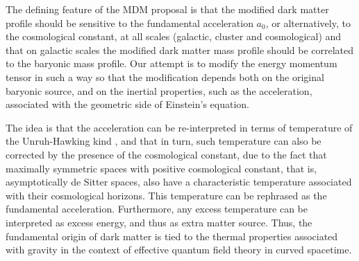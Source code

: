 \documentclass{bjp}
\begin{document}
The defining feature of the MDM proposal is that the modified dark matter profile should be sensitive to the fundamental acceleration $a_0$, or alternatively, to the cosmological constant, at all scales (galactic, cluster and cosmological) and that on galactic scales the modified dark matter mass profile should be correlated to the baryonic mass profile. Our attempt is to modify the energy momentum tensor in such a way so that the modification depends both on the original baryonic source, and on the inertial properties, such as the acceleration, associated with the geometric side of Einstein's equation.

The idea is that the acceleration can be re-interpreted in terms of temperature of the Unruh-Hawking kind \cite{Davies:1974th,Unruh:1976db}, and that in turn, such temperature can also be corrected by the presence of the cosmological constant, due to the fact that maximally symmetric spaces with positive cosmological constant, that is, asymptotically de Sitter spaces, also have a characteristic temperature associated with their cosmological horizons. This temperature can be rephrased as the fundamental acceleration. Furthermore, any excess temperature can be interpreted as excess energy, and thus as extra matter source. Thus, the fundamental origin of dark matter is tied to the thermal properties associated with gravity in the context of effective quantum field theory in curved spacetime.
\end{document}
